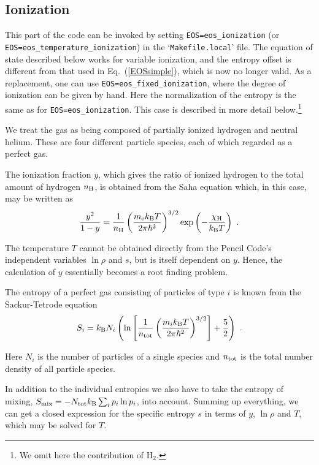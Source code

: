 \documentclass[\mydriver,12pt,twoside,notitlepage,a4paper]{article}
\makeatletter
\newcommand{\code}[1]{\texttt{#1}}
\newcommand{\file}[2][]{%
  \def\index@{#1}%
  `\texttt{#2}'%
  \ifx\index@\@empty\index[file]{#2@\texttt{#2}}%
  \else\index[file]{#1@\texttt{#1}}%
  \fi%
}
\makeatother
\begin{document}
\subsection{Ionization}
\label{S-ionization}

This part of the code can be invoked by setting \code{EOS=eos_ionization}
(or \code{EOS=eos_temperature_ionization}) in the \file{Makefile.local} file.
The equation of state described below works for variable ionization, and the
entropy offset is different from that used in Eq.~(\ref{EOSsimple}), which
is now no longer valid.  As a replacement, one can use
\code{EOS=eos_fixed_ionization}, where the degree of ionization can be given
by hand.  Here the normalization of the entropy is the same as for
\code{EOS=eos_ionization}.  This case is described in more detail
below.\footnote{We omit here the contribution of H$_2$.}

We treat the gas as being composed of partially ionized hydrogen and neutral
helium. These are four different particle species, each of which regarded as
a perfect gas.

The ionization fraction $y$, which gives the ratio of ionized hydrogen to the
total amount of hydrogen $n_{\rm H}$, is obtained from the Saha equation
which, in this case, may be written as
\begin{equation}
\frac{y^2}{1-y}=\frac{1}{n_{\rm H}}
\left(\frac{m_{\rm e}k_{\rm B}T}{2\pi\hbar^2}\right)^{3/2}
\exp\left(-\frac{\chi_{\rm H}}{k_{\rm B}T}\right)\ .
\end{equation}

The temperature $T$ cannot be obtained directly from the {\sc Pencil Code}'s
independent variables $\ln\rho$ and $s$, but is itself dependent on $y$.
Hence, the calculation of $y$ essentially becomes a root finding problem.

The entropy of a perfect gas consisting of particles of type $i$ is known from
the Sackur-Tetrode equation
\begin{equation}
S_i=k_{\rm B}N_i\left(\ln\left[\frac{1}{n_{\rm tot}}
                               \left(\frac{m_ik_{\rm B}T}
                                     {2\pi\hbar^2}\right)^{3/2}\right]
                      +\frac{5}{2}\right)\ .
\end{equation}

Here $N_i$ is the number of particles of a single species and $n_{\rm tot}$
is the total number density of all particle species.

In addition to the individual entropies we also have to take the entropy of
mixing, \mbox{$S_{\rm mix}=-N_{\rm tot}k_{\rm B}\sum_ip_i\ln p_i$}, into
account. Summing up everything, we can get a closed expression for the
specific entropy $s$ in terms of $y$, $\ln\rho$ and $T$, which may be solved
for $T$.
\end{document}
